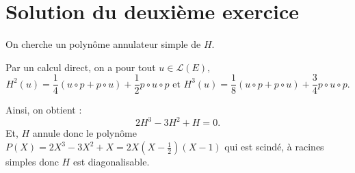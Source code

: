 \section{Solution du deuxième exercice}

On cherche un polynôme annulateur simple de $H.$

Par un calcul direct, on a pour tout $u\in \mathcal{L}(E),$  $$H^{2}(u)=\frac{1}{4}(u\circ p+p\circ u)+\frac{1}{2}p\circ u \circ p \mbox{ et } 
H^{3}(u)=\frac{1}{8}(u\circ p+p\circ u)+\frac{3}{4}p\circ u \circ p.$$

Ainsi, on obtient : $$2H^{3}-3H^{2}+H=0.$$ 
Et, $H$ annule donc le polynôme $\displaystyle P(X)=2X^{3}-3X^{2}+X=2X(X-\frac{1}{2})(X-1)$ qui est scindé, à racines simples donc $H$ est diagonalisable.